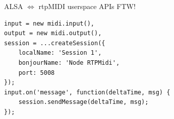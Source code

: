 \begin{frame}
	\centering
	
\end{frame}

\begin{frame}[fragile]{ALSA $\Leftrightarrow$ rtpMIDI}
	userspace APIs FTW!
	

\begin{lstlisting}
input = new midi.input(),
output = new midi.output(),
session = ...createSession({
    localName: 'Session 1',
    bonjourName: 'Node RTPMidi',
    port: 5008
});
input.on('message', function(deltaTime, msg) {
    session.sendMessage(deltaTime, msg);
});
\end{lstlisting}

\end{frame}

